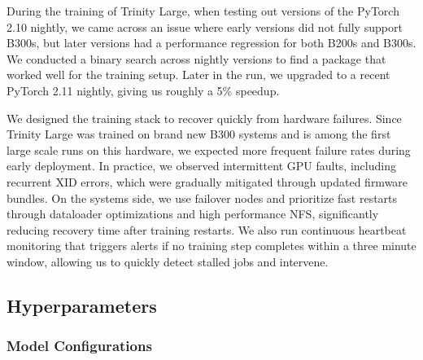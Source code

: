 \documentclass{article}
\begin{document}
During the training of Trinity Large, when testing out versions of the PyTorch 2.10 nightly, we came across an issue where early versions did not fully support B300s, but later versions had a performance regression for both B200s and B300s. We conducted a binary search across nightly versions to find a package that worked well for the training setup. Later in the run, we upgraded to a recent PyTorch 2.11 nightly, giving us roughly a 5\% speedup.

We designed the training stack to recover quickly from hardware failures. Since Trinity Large was trained on brand new B300 systems and is among the first large scale runs on this hardware, we expected more frequent failure rates during early deployment. In practice, we observed intermittent GPU faults, including recurrent XID errors, which were gradually mitigated through updated firmware bundles. On the systems side, we use failover nodes and prioritize fast restarts through dataloader optimizations and high performance NFS, significantly reducing recovery time after training restarts. We also run continuous heartbeat monitoring that triggers alerts if no training step completes within a three minute window, allowing us to quickly detect stalled jobs and intervene.

\subsection{Hyperparameters}

\subsubsection{Model Configurations}
\end{document}
